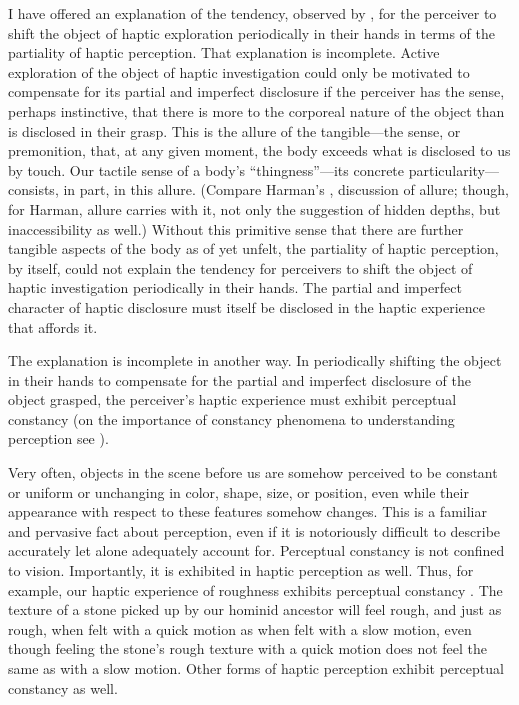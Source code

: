 I have offered an explanation of the tendency, observed by \citet{Lederman:1987fr}, for the perceiver to shift the object of haptic exploration periodically in their hands in terms of the partiality of haptic perception. That explanation is incomplete. Active exploration of the object of haptic investigation could only be motivated to compensate for its partial and imperfect disclosure if the perceiver has the sense, perhaps instinctive, that there is more to the corporeal nature of the object than is disclosed in their grasp. This is the allure of the tangible---the sense, or premonition, that, at any given moment, the body exceeds what is disclosed to us by touch. Our tactile sense of a body's ``thingness''---its concrete particularity---consists, in part, in this allure. (Compare Harman's \citeyear[141--144]{Harman:2005ag}, discussion of allure; though, for Harman, allure carries with it, not only the suggestion of hidden depths, but inaccessibility as well.) Without this primitive sense that there are further tangible aspects of the body as of yet unfelt, the partiality of haptic perception, by itself, could not explain the tendency for perceivers to shift the object of haptic investigation periodically in their hands. The partial and imperfect character of haptic disclosure must itself be disclosed in the haptic experience that affords it.

The explanation is incomplete in another way. In periodically shifting the object in their hands to compensate for the partial and imperfect disclosure of the object grasped, the perceiver's haptic experience must exhibit perceptual constancy (on the importance of constancy phenomena to understanding perception see \citealt{Smith:2002sa,Burge:2010uq}). 

Very often, objects in the scene before us are somehow perceived to be constant or uniform or unchanging in color, shape, size, or position, even while their appearance with respect to these features somehow changes. This is a familiar and pervasive fact about perception, even if it is notoriously difficult to describe accurately let alone adequately account for. Perceptual constancy is not confined to vision. Importantly, it is exhibited in haptic perception as well. Thus, for example, our haptic experience of roughness exhibits perceptual constancy \citep{Yoshioka:2011aa}. The texture of a stone picked up by our hominid ancestor will feel rough, and just as rough, when felt with a quick motion as when felt with a slow motion, even though feeling the stone's rough texture with a quick motion does not feel the same as with a slow motion. Other forms of haptic perception exhibit perceptual constancy as well. 

